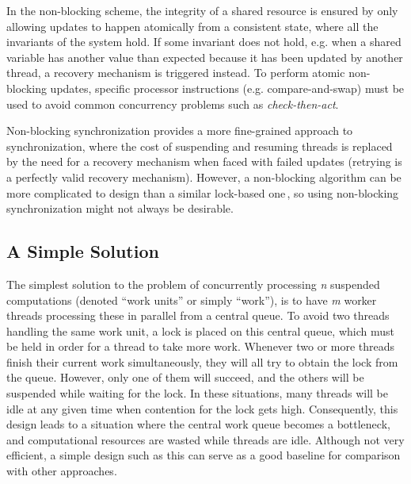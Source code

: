 In the non-blocking scheme, the integrity of a shared resource is ensured by only allowing updates to happen atomically from a consistent state, where all the invariants of the system hold. If some invariant does not hold, e.g. when a shared variable has another value than expected because it has been updated by another thread, a recovery mechanism is triggered instead. To perform atomic non-blocking updates, specific processor instructions (e.g. compare-and-swap) must be used to avoid common concurrency problems such as \emph{check-then-act}. 

Non-blocking synchronization provides a more fine-grained approach to synchronization, where the cost of suspending and resuming threads is replaced by the need for a recovery mechanism when faced with failed updates (retrying is a perfectly valid recovery mechanism). However, a non-blocking algorithm can be more complicated to design than a similar lock-based one\,\citep{Goetz2006}, so using non-blocking synchronization might not always be desirable.




\subsection{A Simple Solution}
The simplest solution to the problem of concurrently processing \emph{n} suspended computations (denoted ``work units'' or simply ``work''), is to have \emph{m} worker threads processing these in parallel from a central queue. To avoid two threads handling the same work unit, a lock is placed on this central queue, which must be held in order for a thread to take more work. Whenever two or more threads finish their current work simultaneously, they will all try to obtain the lock from the queue. However, only one of them will succeed, and the others will be suspended while waiting for the lock. In these situations, many threads will be idle at any given time when contention for the lock gets high. Consequently, this design leads to a situation where the central work queue becomes a bottleneck, and computational resources are wasted while threads are idle. Although not very efficient, a simple design such as this can serve as a good baseline for comparison with other approaches.


